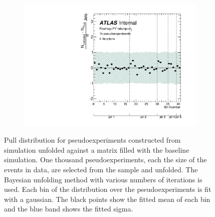 \begin{figure}
\begin{subfigure}[]{0.5\textwidth}
\end{subfigure}
~
\begin{subfigure}[]{0.5\textwidth}
\includegraphics[width=\textwidth]{fig/Stress/110404atlfast/Pull4Iterations.pdf}
\end{subfigure}
\caption{Pull distribution for pseudoexperiments constructed from \hdamp~ simulation unfolded against a matrix filled with the baseline simulation. One thousand pseudoexperiments, each the size of the events in data, are selected from the sample and unfolded. The Bayesian unfolding method with various numbers of iterations is used. Each bin of the distribution over the pseudoexperiments is fit with a gaussian. The black points show the fitted mean of each bin and the blue band shows the fitted sigma.}
\label{fig:hdamppull}
\end{figure}

